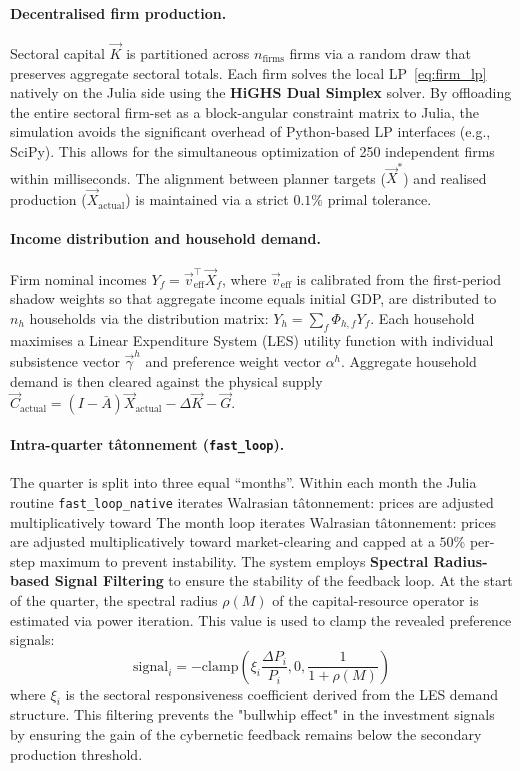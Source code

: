 \paragraph{Decentralised firm production.}
Sectoral capital $\vec{K}$ is partitioned across $n_{\text{firms}}$ firms
via a random draw that preserves aggregate sectoral totals.
Each firm solves the local LP~\eqref{eq:firm_lp} natively on the Julia side 
using the \textbf{HiGHS Dual Simplex} solver. 
By offloading the entire sectoral firm-set as a block-angular constraint 
matrix to Julia, the simulation avoids the significant overhead of 
Python-based LP interfaces (e.g., SciPy). 
This allows for the simultaneous optimization of 250 independent firms 
within milliseconds. 
The alignment between planner targets ($\vec{X}^*$) and realised 
production ($\vec{X}_{\text{actual}}$) is maintained via a 
strict $0.1\%$ primal tolerance.

\paragraph{Income distribution and household demand.}
Firm nominal incomes $Y_f = \vec{v}_{\text{eff}}^\top \vec{X}_f$, where
$\vec{v}_{\text{eff}}$ is calibrated from the first-period shadow weights
so that aggregate income equals initial GDP, are distributed to
$n_h$ households via the distribution matrix:
$Y_h = \sum_f \Phi_{h,f} Y_f$.
Each household maximises a Linear Expenditure System (LES) utility
function with individual subsistence vector $\vec{\gamma}^h$ and preference
weight vector $\alpha^h$.
Aggregate household demand is then cleared against the
physical supply $\vec{C}_{\text{actual}} = (I{-}\bar{A})\vec{X}_{\text{actual}}
- \Delta\vec{K} - \vec{G}$.

\paragraph{Intra-quarter tâtonnement (\texttt{fast\_loop}).}
The quarter is split into three equal ``months''.
Within each month the Julia routine \texttt{fast\_loop\_native} iterates
Walrasian tâtonnement: prices are adjusted multiplicatively toward
The month loop iterates Walrasian tâtonnement: prices are adjusted multiplicatively toward
market-clearing and capped at a $50\%$ per-step maximum to prevent
instability. 
The system employs \textbf{Spectral Radius-based Signal Filtering} to ensure the stability of the feedback loop. At the start of the quarter, the spectral radius $\rho(M)$ of the capital-resource operator is estimated via power iteration. This value is used to clamp the revealed preference signals:
\begin{equation}
  \text{signal}_i = -\text{clamp}\left( \xi_i \frac{\Delta P_i}{P_i}, 0, \frac{1}{1 + \rho(M)} \right)
\end{equation}
where $\xi_i$ is the sectoral responsiveness coefficient derived from the LES demand structure. This filtering prevents the "bullwhip effect" in the investment signals by ensuring the gain of the cybernetic feedback remains below the secondary production threshold.

